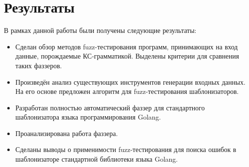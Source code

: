 \documentclass[a4paper]{article}
\begin{document}
\newpage
\section{Результаты}
\indent

В рамках данной работы были получены следующие результаты:
\begin{itemize}
    \item Сделан обзор методов fuzz-тестирования программ, принимающих на вход данные, порождаемые КС-грамматикой. Выделены критерии для сравнения таких фаззеров.
    \item Произведён анализ существующих инструментов генерации входных данных. На его основе предложен алгоритм для fuzz-тестирования шаблонизаторов.
    \item Разработан полностью автоматический фаззер для стандартного шаблонизатора
    языка программирования Golang.
    \item Проанализирована работа фаззера.
    \item Сделаны выводы о применимости fuzz-тестирования для поиска ошибок в шаблонизаторе стандартной библиотеки языка Golang.
\end{itemize}

\newpage
\end{document}
